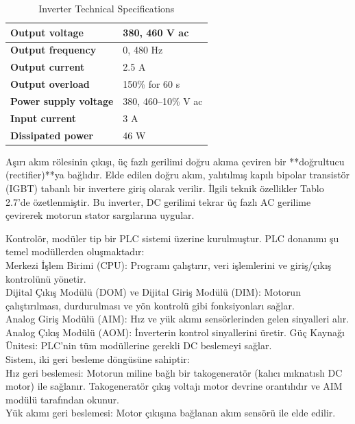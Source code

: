 \begin{table}[h!]
\centering
\label{tab:inverter_specs}
\begin{tabular}{|l|l|}
\hline
\textbf{Output voltage} & 380, 460 V ac \\ \hline
\textbf{Output frequency} & 0, 480 Hz \\ \hline
\textbf{Output current} & 2.5 A \\ \hline
\textbf{Output overload} & 150\% for 60 s \\ \hline
\textbf{Power supply voltage} & 380, 460--10\% V ac \\ \hline
\textbf{Input current} & 3 A \\ \hline
\textbf{Dissipated power} & 46 W \\ \hline
\end{tabular}
\caption{Inverter Technical Specifications}
\end{table}

Aşırı akım rölesinin çıkışı, üç fazlı gerilimi doğru akıma çeviren bir **doğrultucu (rectifier)**ya bağlıdır. Elde edilen doğru akım, yalıtılmış kapılı bipolar transistör (IGBT) tabanlı bir invertere giriş olarak verilir. İlgili teknik özellikler Tablo 2.7’de özetlenmiştir. Bu inverter, DC gerilimi tekrar üç fazlı AC gerilime çevirerek motorun stator sargılarına uygular.

Kontrolör, modüler tip bir PLC sistemi üzerine kurulmuştur. PLC donanımı şu temel modüllerden oluşmaktadır:\\
Merkezi İşlem Birimi (CPU): Programı çalıştırır, veri işlemlerini ve giriş/çıkış kontrolünü yönetir.\\
Dijital Çıkış Modülü (DOM) ve Dijital Giriş Modülü (DIM): Motorun çalıştırılması, durdurulması ve yön kontrolü gibi fonksiyonları sağlar.\\
Analog Giriş Modülü (AIM): Hız ve yük akımı sensörlerinden gelen sinyalleri alır.\\
Analog Çıkış Modülü (AOM): İnverterin kontrol sinyallerini üretir.
Güç Kaynağı Ünitesi: PLC’nin tüm modüllerine gerekli DC beslemeyi sağlar.\\

Sistem, iki geri besleme döngüsüne sahiptir:\\
Hız geri beslemesi: Motorun miline bağlı bir takogeneratör (kalıcı mıknatıslı DC motor) ile sağlanır. Takogeneratör çıkış voltajı motor devrine orantılıdır ve AIM modülü tarafından okunur.\\
Yük akımı geri beslemesi: Motor çıkışına bağlanan akım sensörü ile elde edilir.

